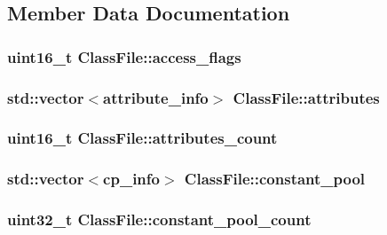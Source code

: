 \subsection{Member Data Documentation}
\hypertarget{classClassFile_a2d095ef980330834af44c587ce52590e}{
\subsubsection[{access\+\_\+flags}]{\setlength{\rightskip}{0pt plus 5cm}uint16\+\_\+t Class\+File\+::access\+\_\+flags}}\label{classClassFile_a2d095ef980330834af44c587ce52590e}
\hypertarget{classClassFile_a119011b9d84894da116c83fa6539d5ce}{
\subsubsection[{attributes}]{\setlength{\rightskip}{0pt plus 5cm}std\+::vector$<${\bf attribute\+\_\+info}$>$ Class\+File\+::attributes}}\label{classClassFile_a119011b9d84894da116c83fa6539d5ce}
\hypertarget{classClassFile_accd99ee441c45eb8fdcd3836d56e9ef4}{
\subsubsection[{attributes\+\_\+count}]{\setlength{\rightskip}{0pt plus 5cm}uint16\+\_\+t Class\+File\+::attributes\+\_\+count}}\label{classClassFile_accd99ee441c45eb8fdcd3836d56e9ef4}
\hypertarget{classClassFile_aecb7bcd6074a0dbda85dea876a691187}{
\subsubsection[{constant\+\_\+pool}]{\setlength{\rightskip}{0pt plus 5cm}std\+::vector$<${\bf cp\+\_\+info}$>$ Class\+File\+::constant\+\_\+pool}}\label{classClassFile_aecb7bcd6074a0dbda85dea876a691187}
\hypertarget{classClassFile_a76abb829a9ebb954e9ef381f144bdbf9}{
\subsubsection[{constant\+\_\+pool\+\_\+count}]{\setlength{\rightskip}{0pt plus 5cm}uint32\+\_\+t Class\+File\+::constant\+\_\+pool\+\_\+count}}\label{classClassFile_a76abb829a9ebb954e9ef381f144bdbf9}
